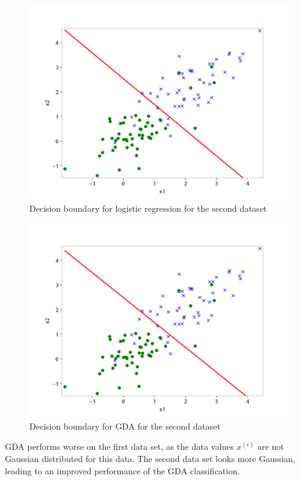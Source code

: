 \FloatBarrier
\begin{answer}
    \begin{figure}[h]
        \centering
        \includegraphics*[width=.7\linewidth]{../src/linearclass/logreg_pred_2.pdf}
        \caption{Decision boundary for logistic regression for the second dataset}        
    \end{figure}

    \begin{figure}[h]
        \centering
        \includegraphics*[width=.7\linewidth]{../src/linearclass/gda_pred_2.pdf}
        \caption{Decision boundary for GDA for the second dataset}        
    \end{figure}

    GDA performs worse on the first data set, as the data values $x^{(i)}$ are not Gaussian distributed for this data.
The second data set looks more Gaussian, leading to an improved performance of the GDA classification.
\end{answer}

\FloatBarrier
